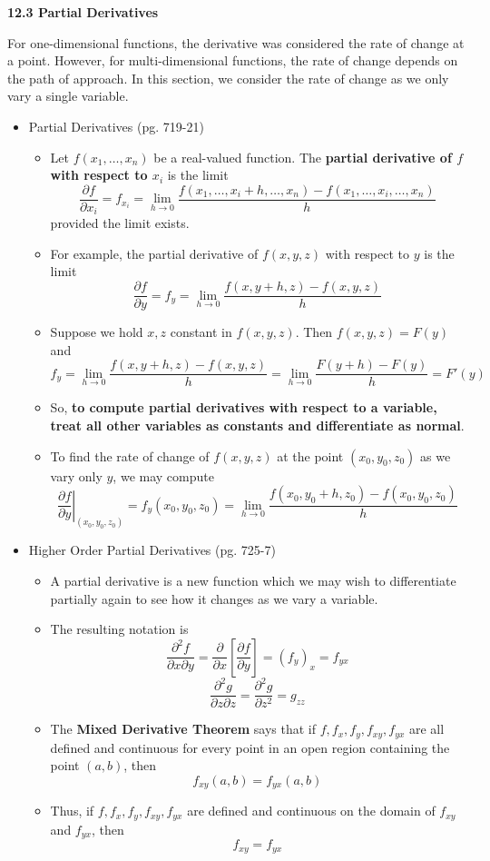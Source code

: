 \documentclass[12pt]{article}
\theoremstyle{plain}
\theoremstyle{definition}
\theoremstyle{remark}
\begin{document}
	\newpage
	
	\centerline{\bf 12.3 Partial Derivatives}
	
	For one-dimensional functions, the derivative was considered the rate of change at a point. However, for multi-dimensional functions, the rate of change depends on the path of approach. In this section, we consider the rate of change as we only vary a single variable.
	
	\begin{itemize}
	
	\item Partial Derivatives (pg. 719-21)
	
		\begin{itemize}
		\item Let $f(x_1,\dots,x_n)$ be a real-valued function.  The \textbf{partial derivative of $f$ with respect to $x_i$} is the limit \[\frac{\partial f}{\partial x_i}=f_{x_i}=\lim_{h\to 0}\frac{f(x_1,\dots,x_i+h,\dots,x_n)-f(x_1,\dots,x_i,\dots,x_n)}{h}\] provided the limit exists.
		\item For example, the partial derivative of $f(x,y,z)$ with respect to $y$ is the limit \[\frac{\partial f}{\partial y} = f_y = \lim_{h\to 0}\frac{f(x,y+h,z)-f(x,y,z)}{h}\]
		\item Suppose we hold $x,z$ constant in $f(x,y,z)$. Then $f(x,y,z)=F(y)$ and \[f_y = \lim_{h\to 0}\frac{f(x,y+h,z)-f(x,y,z)}{h}=\lim_{h\to 0}\frac{F(y+h)-F(y)}{h}=F'(y)\]
		\item So, \textbf{to compute partial derivatives with respect to a variable, treat all other variables as constants and differentiate as normal}.
		\item To find the rate of change of $f(x,y,z)$ at the point $(x_0,y_0,z_0)$ as we vary only $y$, we may compute \[\left.\frac{\partial f}{\partial y} \right|_{(x_0,y_0,z_0)}=f_y(x_0,y_0,z_0)=\lim_{h\to 0}\frac{f(x_0,y_0+h,z_0)-f(x_0,y_0,z_0)}{h}\]
		\end{itemize}
		
	\item Higher Order Partial Derivatives (pg. 725-7)
	
		\begin{itemize}
		\item A partial derivative is a new function which we may wish to differentiate partially again to see how it changes as we vary a variable.
		\item The resulting notation is \[\frac{\partial^2 f}{\partial x\partial y} = \frac{\partial}{\partial x}\left[ \frac{\partial f}{\partial y} \right] = (f_y)_x = f_{yx}\] \[\frac{\partial^2 g}{\partial z\partial z}= \frac{\partial^2 g}{\partial z^2}= g_{zz}\]
		\item The \textbf{Mixed Derivative Theorem} says that if $f,f_x,f_y,f_{xy},f_{yx}$ are all defined and continuous for every point in an open region containing the point $(a,b)$, then \[f_{xy}(a,b)=f_{yx}(a,b)\]
		\item Thus, if $f,f_x,f_y,f_{xy},f_{yx}$ are defined and continuous on the domain of $f_{xy}$ and $f_{yx}$, then \[f_{xy}=f_{yx}\]
		\end{itemize}
		

\end{itemize}
\end{document}
